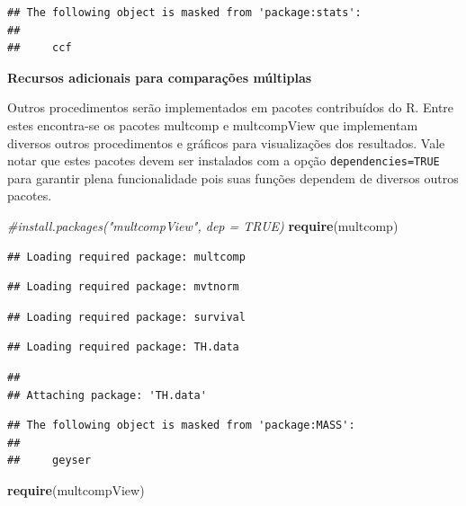 \documentclass[
]{book}
\newenvironment{Shaded}{\begin{snugshade}}{\end{snugshade}}
\newcommand{\CommentTok}[1]{\textcolor[rgb]{0.56,0.35,0.01}{\textit{#1}}}
\newcommand{\KeywordTok}[1]{\textcolor[rgb]{0.13,0.29,0.53}{\textbf{#1}}}
\newcommand{\NormalTok}[1]{#1}
\begin{document}
\begin{verbatim}
## The following object is masked from 'package:stats':
## 
##     ccf
\end{verbatim}

\textbf{Recursos adicionais para comparações múltiplas}

Outros procedimentos serão implementados em pacotes contribuídos do R. Entre estes encontra-se os pacotes multcomp e multcompView que implementam diversos outros procedimentos e gráficos para visualizações dos resultados. Vale notar que estes pacotes devem ser instalados com a opção \texttt{dependencies=TRUE} para garantir plena funcionalidade pois suas funções dependem de diversos outros pacotes.

\begin{Shaded}
\begin{Highlighting}[]
\CommentTok{#install.packages("multcompView", dep = TRUE) }
\KeywordTok{require}\NormalTok{(multcomp) }
\end{Highlighting}
\end{Shaded}

\begin{verbatim}
## Loading required package: multcomp
\end{verbatim}

\begin{verbatim}
## Loading required package: mvtnorm
\end{verbatim}

\begin{verbatim}
## Loading required package: survival
\end{verbatim}

\begin{verbatim}
## Loading required package: TH.data
\end{verbatim}

\begin{verbatim}
## 
## Attaching package: 'TH.data'
\end{verbatim}

\begin{verbatim}
## The following object is masked from 'package:MASS':
## 
##     geyser
\end{verbatim}

\begin{Shaded}
\begin{Highlighting}[]
\KeywordTok{require}\NormalTok{(multcompView)}
\end{Highlighting}
\end{Shaded}
\end{document}
